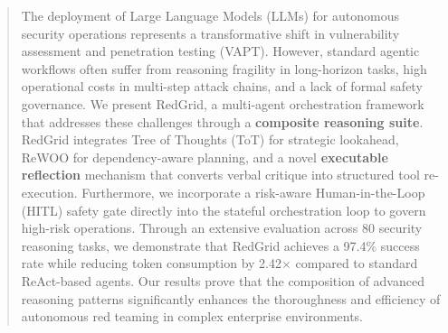 \begin{abstract}
The deployment of Large Language Models (LLMs) for autonomous security operations represents a transformative shift in vulnerability assessment and penetration testing (VAPT). However, standard agentic workflows often suffer from reasoning fragility in long-horizon tasks, high operational costs in multi-step attack chains, and a lack of formal safety governance. We present RedGrid, a multi-agent orchestration framework that addresses these challenges through a \textbf{composite reasoning suite}. RedGrid integrates Tree of Thoughts (ToT) for strategic lookahead, ReWOO for dependency-aware planning, and a novel \textbf{executable reflection} mechanism that converts verbal critique into structured tool re-execution. Furthermore, we incorporate a risk-aware Human-in-the-Loop (HITL) safety gate directly into the stateful orchestration loop to govern high-risk operations. Through an extensive evaluation across 80 security reasoning tasks, we demonstrate that RedGrid achieves a 97.4\% success rate while reducing token consumption by 2.42$\times$ compared to standard ReAct-based agents. Our results prove that the composition of advanced reasoning patterns significantly enhances the thoroughness and efficiency of autonomous red teaming in complex enterprise environments.
\end{abstract}
